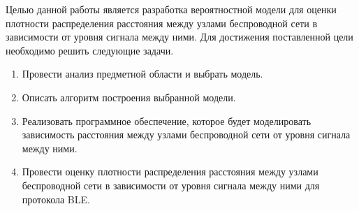 Целью данной работы является разработка вероятностной модели для оценки плотности распределения расстояния между узлами беспроводной сети в зависимости от уровня сигнала между ними. Для достижения поставленной цели необходимо решить следующие задачи.

\begin{enumerate}[label*=\arabic*.]
	\item Провести анализ предметной области и выбрать модель.
	\item Описать алгоритм построения выбранной модели.
	\item Реализовать программное обеспечение, которое будет моделировать зависимость расстояния между узлами беспроводной сети от уровня сигнала между ними. 
	\item Провести оценку плотности распределения расстояния между узлами беспроводной сети в зависимости от уровня сигнала между ними для протокола BLE.
\end{enumerate}